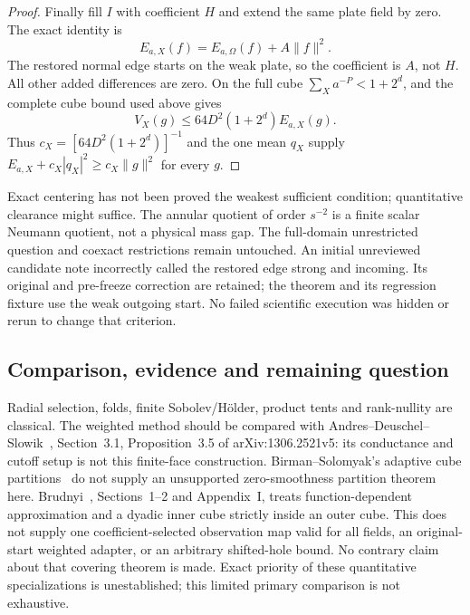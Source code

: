 \begin{proof}
Finally fill $I$ with coefficient $H$ and extend the same plate field
by zero. The exact identity is
\[
 E_{a,X}(f)=E_{a,\Omega}(f)+A\|f\|^2.
\]
The restored normal edge starts on the weak plate, so the coefficient
is $A$, not $H$. All other added differences are zero. On the full
cube $\sum_Xa^{-P}<1+2^d$, and the complete cube bound used above gives
\[
 V_X(g)\le64D^2(1+2^d)E_{a,X}(g).
\]
Thus $c_X=[64D^2(1+2^d)]^{-1}$ and the one mean $q_X$ supply
$E_{a,X}+c_X|q_X|^2\ge c_X\|g\|^2$ for every $g$.
\end{proof}

Exact centering has not been proved the weakest sufficient condition;
quantitative clearance might suffice. The annular quotient of order
$s^{-2}$ is a finite scalar Neumann quotient, not a physical mass gap.
The full-domain unrestricted question and coexact restrictions remain
untouched. An initial unreviewed candidate note incorrectly called the
restored edge strong and incoming. Its original and pre-freeze correction
are retained; the theorem and its regression fixture use the weak outgoing
start. No failed scientific execution was hidden or rerun to change that
criterion.

\subsection{Comparison, evidence and remaining question}
Radial selection, folds, finite Sobolev/H\"older, product tents and
rank-nullity are classical. The weighted method should be compared with
Andres--Deuschel--Slowik~\cite{ads221}, Section~3.1, Proposition~3.5 of arXiv:1306.2521v5: its conductance and cutoff setup is not this finite-face
construction. Birman--Solomyak's adaptive cube partitions~\cite{birman221} do not supply
an unsupported zero-smoothness partition theorem here.
Brudnyi~\cite{brudnyi221}, Sections~1--2 and Appendix~I, treats
function-dependent approximation and a dyadic inner cube strictly inside
an outer cube. This does not supply one coefficient-selected observation
map valid for all fields, an original-start weighted adapter, or an
arbitrary shifted-hole bound. No contrary claim about that covering
theorem is made. Exact priority of these quantitative specializations
is unestablished; this limited primary comparison is not exhaustive.

